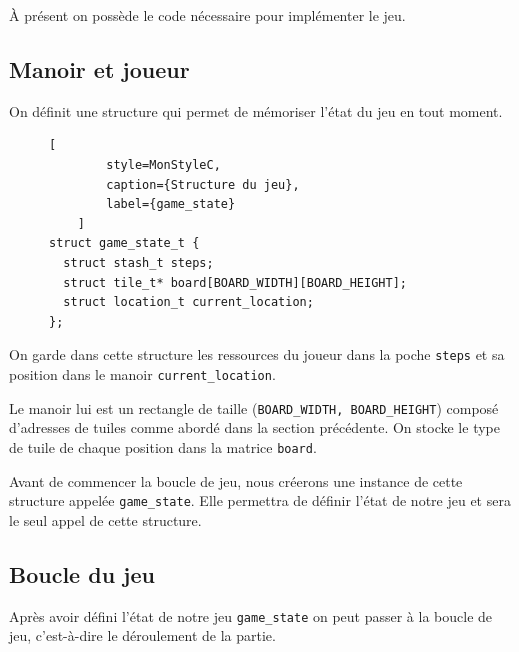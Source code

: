 
\`A présent on possède le code nécessaire pour implémenter le jeu.

\subsection{Manoir et joueur}

On définit une structure qui permet de mémoriser l'état du jeu en tout moment.

\begin{figure}[H]
    \centering
    \captionsetup[lstlisting]{name=Figure}
    \begin{lstlisting}[
        style=MonStyleC,
        caption={Structure du jeu},
        label={game_state}
    ]
struct game_state_t {
  struct stash_t steps;
  struct tile_t* board[BOARD_WIDTH][BOARD_HEIGHT];
  struct location_t current_location;
};
    \end{lstlisting}
\end{figure}

On garde dans cette structure les ressources du joueur dans la poche \texttt{steps} et sa position dans le manoir \texttt{current\_location}.

Le manoir lui est un rectangle de taille (\texttt{BOARD\_WIDTH, BOARD\_HEIGHT}) composé d'adresses de tuiles comme abordé dans la section précédente. On stocke le type de tuile de chaque position dans la matrice \texttt{board}.

Avant de commencer la boucle de jeu, nous créerons une instance de cette structure appelée \texttt{game\_state}. Elle permettra de définir l'état de notre jeu et sera le seul appel de cette structure.

\subsection{Boucle du jeu}\label{ssec:main}

Après avoir défini l'état de notre jeu \texttt{game\_state} on peut passer à la boucle de jeu, c'est-à-dire le déroulement de la partie.

